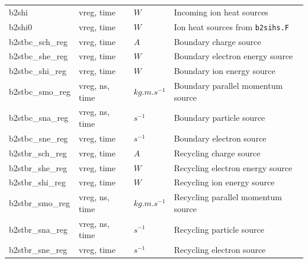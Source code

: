 \documentclass[a4paper,10pt]{report}
\begin{document}
\begin{center}
\begin{longtable}{|l|l|l|l|}
b2shi \index{b2shi}\index{b2tallies.nc, b2shi}                                   & vreg, time     & $W$           & Incoming ion heat sources \\
b2shi0 \index{b2shi0}\index{b2tallies.nc, b2shi0}                                & vreg, time     & $W$           & Ion heat sources from {\tt b2sihs.F} \\
b2stbc\_sch\_reg \index{b2stbc\_sch\_reg}\index{b2tallies.nc, b2stbc\_sch\_reg}  & vreg, time     & $A$           & Boundary charge source \\
b2stbc\_she\_reg \index{b2stbc\_she\_reg}\index{b2tallies.nc, b2stbc\_she\_reg}  & vreg, time     & $W$           & Boundary electron energy source \\
b2stbc\_shi\_reg \index{b2stbc\_shi\_reg}\index{b2tallies.nc, b2stbc\_shi\_reg}  & vreg, time     & $W$           & Boundary ion energy source \\
b2stbc\_smo\_reg \index{b2stbc\_smo\_reg}\index{b2tallies.nc, b2stbc\_smo\_reg}  & vreg, ns, time & $kg.m.s^{-1}$ & Boundary parallel momentum source \\
b2stbc\_sna\_reg \index{b2stbc\_sna\_reg}\index{b2tallies.nc, b2stbc\_sna\_reg}  & vreg, ns, time & $s^{-1}$      & Boundary particle source \\
b2stbc\_sne\_reg \index{b2stbc\_sne\_reg}\index{b2tallies.nc, b2stbc\_sne\_reg}  & vreg, time     & $s^{-1}$      & Boundary electron source \\
b2stbr\_sch\_reg \index{b2stbr\_sch\_reg}\index{b2tallies.nc, b2stbr\_sch\_reg}  & vreg, time     & $A$           & Recycling charge source \\
b2stbr\_she\_reg \index{b2stbr\_she\_reg}\index{b2tallies.nc, b2stbr\_she\_reg}  & vreg, time     & $W$           & Recycling electron energy source \\
b2stbr\_shi\_reg \index{b2stbr\_shi\_reg}\index{b2tallies.nc, b2stbr\_shi\_reg}  & vreg, time     & $W$           & Recycling ion energy source \\
b2stbr\_smo\_reg \index{b2stbr\_smo\_reg}\index{b2tallies.nc, b2stbr\_smo\_reg}  & vreg, ns, time & $kg.m.s^{-1}$ & Recycling parallel momentum source \\
b2stbr\_sna\_reg \index{b2stbr\_sna\_reg}\index{b2tallies.nc, b2stbr\_sna\_reg}  & vreg, ns, time & $s^{-1}$      & Recycling particle source \\
b2stbr\_sne\_reg \index{b2stbr\_sne\_reg}\index{b2tallies.nc, b2stbr\_sne\_reg}  & vreg, time     & $s^{-1}$      & Recycling electron source \\

\end{longtable}
\end{center}
\end{document}
